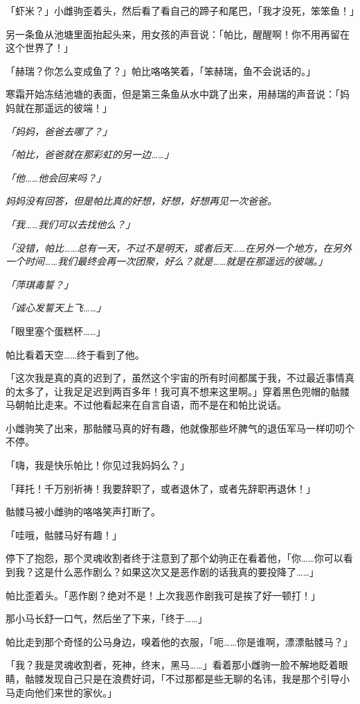 「虾米？」小雌驹歪着头，然后看了看自己的蹄子和尾巴，「我才没死，笨笨鱼！」

另一条鱼从池塘里面抬起头来，用女孩的声音说：「帕比，醒醒啊！你不用再留在这个世界了！」

「赫瑞？你怎么变成鱼了？」帕比咯咯笑着，「笨赫瑞，鱼不会说话的。」

寒霜开始冻结池塘的表面，但是第三条鱼从水中跳了出来，用赫瑞的声音说：「妈妈就在那遥远的彼端！」

\emph{「妈妈，爸爸去哪了？」}

\emph{「帕比，爸爸就在那彩虹的另一边……」}

\emph{「他……他会回来吗？」}

\emph{妈妈没有回答，但是帕比真的好想，好想，好想再见一次爸爸。}

\emph{「我……我们可以去找他么？」}

\emph{「没错，帕比……总有一天，不过不是明天，或者后天……在另外一个地方，在另外一个时间……我们最终会再一次团聚，好么？就是……就是在那遥远的彼端。」}

\emph{「萍琪毒誓？」}

\emph{「诚心发誓天上飞……」}

「眼里塞个蛋糕杯……」

帕比看着天空……终于看到了他。

「这次我是真的真的迟到了，虽然这个宇宙的所有时间都属于我，不过最近事情真的太多了，让我足足迟到两百多年！我可真不想来这里啊。」穿着黑色兜帽的骷髅马朝帕比走来。不过他看起来在自言自语，而不是在和帕比说话。

小雌驹笑了出来，那骷髅马真的好有趣，他就像那些坏脾气的退伍军马一样叨叨个不停。

「嗨，我是快乐帕比！你见过我妈妈么？」

「拜托！千万别祈祷！我要辞职了，或者退休了，或者先辞职再退休！」

骷髅马被小雌驹的咯咯笑声打断了。

「哇哦，骷髅马好有趣！」

停下了抱怨，那个灵魂收割者终于注意到了那个幼驹正在看着他，「你……你可以看到我？这是什么恶作剧么？如果这次又是恶作剧的话我真的要投降了……」

帕比歪着头。「恶作剧？绝对不是！上次我恶作剧我可是挨了好一顿打！」

那小马长舒一口气，然后坐了下来，「终于……」

帕比走到那个奇怪的公马身边，嗅着他的衣服，「呃……你是谁啊，漂漂骷髅马？」

「我？我是灵魂收割者，死神，终末，黑马……」看着那小雌驹一脸不解地眨着眼睛，骷髅发现自己只是在浪费好词，「不过那都是些无聊的名讳，我是那个引导小马走向他们来世的家伙。」

